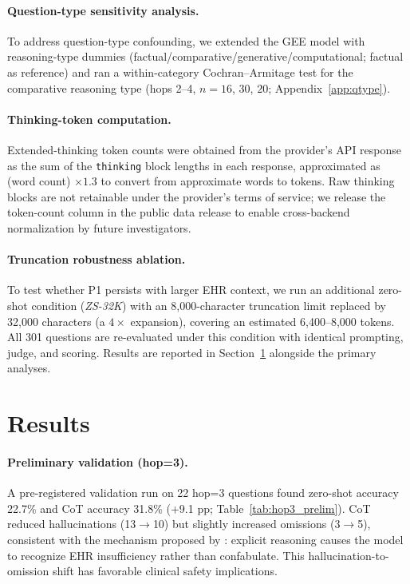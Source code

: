 \documentclass{article}
\begin{document}
\paragraph{Question-type sensitivity analysis.}
To address question-type confounding, we extended the GEE model with reasoning-type dummies (factual/comparative/generative/computational; factual as reference) and ran a within-category Cochran--Armitage test for the comparative reasoning type (hops 2--4, $n = 16$, $30$, $20$; Appendix~\ref{app:qtype}).

\paragraph{Thinking-token computation.}
Extended-thinking token counts were obtained from the provider's API response as
the sum of the \texttt{thinking} block lengths in each response, approximated
as (word count) $\times 1.3$ to convert from approximate words to tokens.
Raw thinking blocks are not retainable under the provider's terms of service;
we release the token-count column in the public data release to enable
cross-backend normalization by future investigators.

\paragraph{Truncation robustness ablation.}
To test whether P1 persists with larger EHR context, we run an additional
zero-shot condition (\textit{ZS-32K}) with an 8,000-character truncation limit
replaced by 32,000 characters (a $4\times$ expansion), covering an estimated
6,400--8,000 tokens. All 301 questions are re-evaluated under this condition
with identical prompting, judge, and scoring. Results are reported in
Section~\ref{sec:results} alongside the primary analyses.

\section{Results}
\label{sec:results}

\paragraph{Preliminary validation (hop=3).}
A pre-registered validation run on 22 hop=3 questions found zero-shot accuracy 22.7\% and CoT accuracy 31.8\% (+9.1 pp; Table~\ref{tab:hop3_prelim}). CoT reduced hallucinations (13$\to$10) but slightly increased omissions (3$\to$5), consistent with the mechanism proposed by \citet{nye2021show}: explicit reasoning causes the model to recognize EHR insufficiency rather than confabulate. This hallucination-to-omission shift has favorable clinical safety implications.
\end{document}
